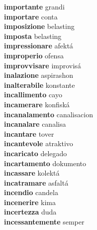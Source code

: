 \textbf{importante } grandi \\
\textbf{importare } conta \\
\textbf{imposizione } belasting \\
\textbf{imposta } belasting \\
\textbf{impressionare } afektá \\
\textbf{improperio } ofensa \\
\textbf{improvvisare } improvisá \\
\textbf{inalazione } aspirashon \\
\textbf{inalterabile } konstante \\
\textbf{incallimento } cayo \\
\textbf{incamerare } konfiská \\
\textbf{incanalamento } canalisacion \\
\textbf{incanalare } canalisa \\
\textbf{incantare } tover \\
\textbf{incantevole } atraktivo \\
\textbf{incaricato } delegado \\
\textbf{incartamento } dokumento \\
\textbf{incassare } kolektá \\
\textbf{incatramare } asfaltá \\
\textbf{incendio } candela \\
\textbf{incenerire } kima \\
\textbf{incertezza } duda \\
\textbf{incessantemente } semper \\
